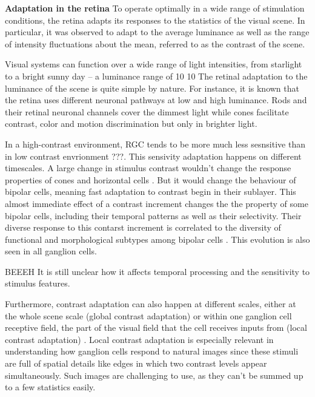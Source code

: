 \textbf{Adaptation in the retina}
To operate optimally in a wide range of
stimulation conditions, the retina adapts its responses to the statistics of
the visual scene.
In particular, it was observed to adapt to the average
luminance as well as the range of intensity fluctuations about the mean,
referred to as the contrast of the scene.

Visual systems can function over a wide range of light intensities, from
starlight to a bright sunny day – a luminance range of 10 10
The retinal adaptation to the luminance of the scene is quite simple by nature.
For instance, it is known that the retina uses different neuronal
pathways at low and high luminance. Rods and their retinal neuronal channels
cover the dimmest light while cones facilitate contrast, color and motion
discrimination but only in brighter light.

In a high-contrast environment, RGC tends to be more much less sesnsitive than
in low contrast envrionment \cite{} ???.
This sensivity adaptation happens on different timescales.
A large change in stimulus contrast wouldn't change the response properties of
cones and horizontal cells \cite{}. But it would change the behaviour of
bipolar cells, meaning fast adaptation to contrast begin in their sublayer.
This almost immediate effect of a contrast increment changes the the property
of some bipolar cells, including their temporal patterns as well as their
selectivity. Their diverse response to this contarst increment
is correlated to the diversity of functional and morphological subtypes among
bipolar cells \cite{baccus_fast_2002}.
This evolution is also seen in all ganglion cells.


BEEEH It is still unclear how it
affects temporal processing and the sensitivity to stimulus
features\citep{baccus_fast_2002}.

Furthermore, contrast adaptation can also
happen at different scales, either at the whole scene scale (global contrast
adaptation) or within one ganglion cell receptive field, the part of the visual
field that the cell receives inputs from (local contrast adaptation)
\citep{garvert_local_2013}. Local contrast adaptation is especially relevant in
understanding how ganglion cells respond to natural images since these stimuli
are full of spatial details like edges in which two contrast levels appear
simultaneously. Such images are challenging to use, as they can't be summed up
to a few statistics easily.

